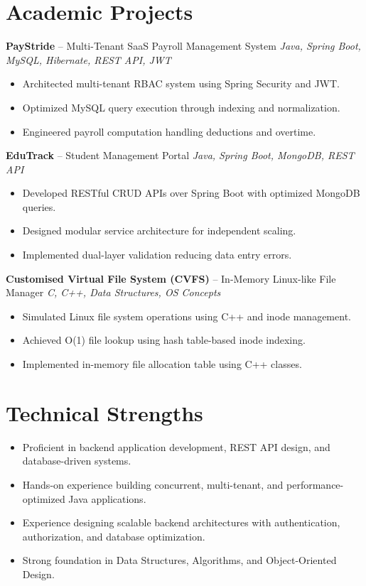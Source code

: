 \documentclass[10.5pt,a4paper]{article}
\begin{document}
\section{Academic Projects}
\textbf{PayStride} -- Multi-Tenant SaaS Payroll Management System \hfill \textit{Java, Spring Boot, MySQL, Hibernate, REST API, JWT}
\begin{itemize}
  \item Architected multi-tenant RBAC system using Spring Security and JWT.
  \item Optimized MySQL query execution through indexing and normalization.
  \item Engineered payroll computation handling deductions and overtime.
\end{itemize}
\vspace{4pt}
\textbf{EduTrack} -- Student Management Portal \hfill \textit{Java, Spring Boot, MongoDB, REST API}
\begin{itemize}
  \item Developed RESTful CRUD APIs over Spring Boot with optimized MongoDB queries.
  \item Designed modular service architecture for independent scaling.
  \item Implemented dual-layer validation reducing data entry errors.
\end{itemize}
\vspace{4pt}
\textbf{Customised Virtual File System (CVFS)} -- In-Memory Linux-like File Manager \hfill \textit{C, C++, Data Structures, OS Concepts}
\begin{itemize}
  \item Simulated Linux file system operations using C++ and inode management.
  \item Achieved O(1) file lookup using hash table-based inode indexing.
  \item Implemented in-memory file allocation table using C++ classes.
\end{itemize}
\section{Technical Strengths}
\begin{itemize}
  \item Proficient in backend application development, REST API design, and database-driven systems.
  \item Hands-on experience building concurrent, multi-tenant, and performance-optimized Java applications.
  \item Experience designing scalable backend architectures with authentication, authorization, and database optimization.
  \item Strong foundation in Data Structures, Algorithms, and Object-Oriented Design.
\end{itemize}
\end{document}
